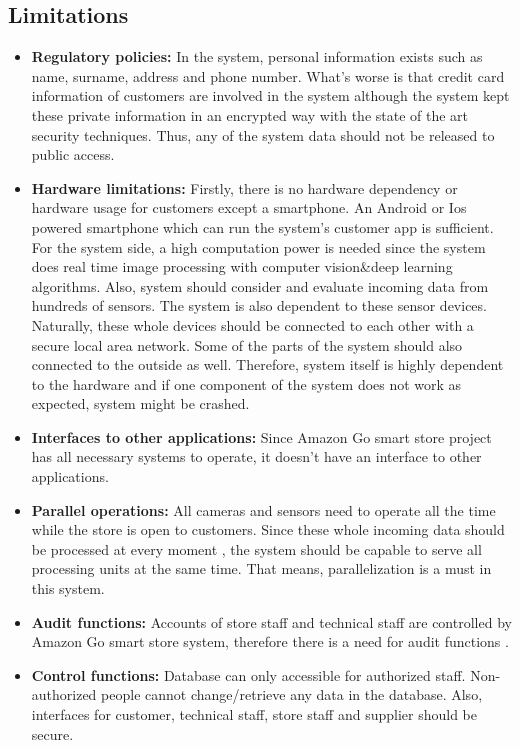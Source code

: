\subsection{Limitations}
\begin{itemize}
    \item \textbf{Regulatory policies:} In the system, personal information exists such as name, surname, address and phone number. What's worse is that credit card information of customers are involved in the system although the system kept these private information in an encrypted way with the state of the art security techniques. Thus, any of the system data should not be released to public access. 
    \item\textbf{Hardware limitations:} Firstly, there is no hardware dependency or hardware usage for customers except a smartphone. An Android or Ios powered smartphone which can run the system's customer app is sufficient. For the system side, a high computation power is needed since the system does real time image processing with computer vision\&deep learning algorithms. Also, system should consider and evaluate incoming data from hundreds of sensors. The system is also dependent to these sensor devices. Naturally, these whole devices should be connected to each other with a secure local area network. Some of the parts of the system should also connected to the outside as well. Therefore, system itself is highly dependent to the hardware and if one component of the system does not work as expected, system might be crashed.       
    \item\textbf{Interfaces to other applications:} Since Amazon Go smart store project has all
    necessary systems to operate, it doesn't have an interface to other applications. 
    \item\textbf{Parallel operations:} All cameras and sensors need to operate all the time while the store is open to customers. Since these whole incoming data should be processed at every
    moment , the system should be capable to serve all processing units at the same time. That means, parallelization is a must in this system.
    \item\textbf{Audit functions:} Accounts of store staff and technical staff are controlled by Amazon Go smart store system, therefore there is a need for audit functions .
    \item\textbf{Control functions:} Database can only accessible for authorized staff. Non-authorized people cannot change/retrieve any data in the database. Also, interfaces for customer, technical staff, store staff and supplier should be secure. 

\end{itemize}
